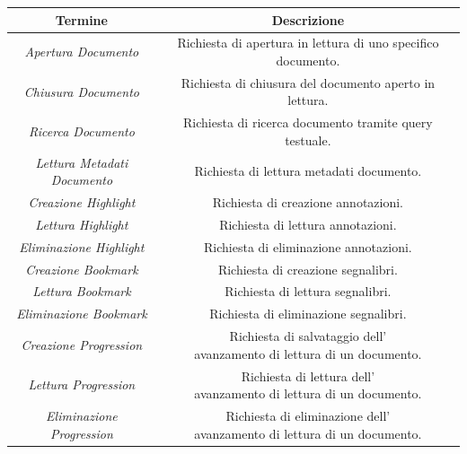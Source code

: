 \begin{longtable}{|c|c|}
         \hline
         \textbf{Termine} & \textbf{Descrizione}\\
         \hline
         \textit{Apertura Documento} & \specialcell{Richiesta di apertura in lettura di uno specifico\\ documento.}\\
         \hline
         \textit{Chiusura Documento} & Richiesta di chiusura del documento aperto in lettura.\\
         \hline
         \textit{Ricerca Documento} & Richiesta di ricerca documento tramite query testuale.\\
         \hline
         \specialcell{\textit{Lettura Metadati}\\\textit{Documento}} & Richiesta di lettura metadati documento.\\
         \hline
         \textit{Creazione Highlight} & Richiesta di creazione annotazioni.\\
         \hline
         \textit{Lettura Highlight} & Richiesta di lettura annotazioni.\\
         \hline
         \textit{Eliminazione Highlight} & Richiesta di eliminazione annotazioni.\\
         \hline
         \textit{Creazione Bookmark} & Richiesta di creazione segnalibri.\\
         \hline
         \textit{Lettura Bookmark} & Richiesta di lettura segnalibri.\\
         \hline
         \textit{Eliminazione Bookmark} & Richiesta di eliminazione segnalibri.\\
         \hline
         \textit{Creazione Progression} & \specialcell{Richiesta di salvataggio dell'\\avanzamento di lettura di un documento.}\\
         \hline
         \textit{Lettura Progression} &  \specialcell{Richiesta di lettura dell'\\avanzamento di lettura di un documento.}\\
         \hline
         \textit{Eliminazione Progression} &  \specialcell{Richiesta di eliminazione dell'\\avanzamento di lettura di un documento.}\\

\end{longtable}
